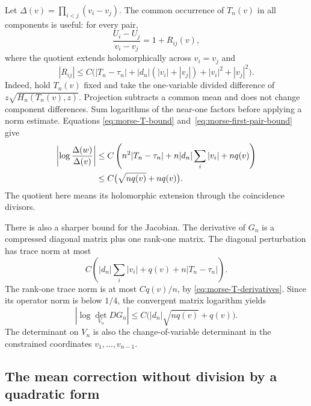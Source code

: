 \documentclass[11pt]{article}
\numberwithin{equation}{section}
\theoremstyle{definition}
\begin{document}
Let $\Delta(v)=\prod_{i<j}(v_i-v_j)$.  The common occurrence of $T_n(v)$
in all components is useful: for every pair,
\begin{equation}
 \frac{U_i-U_j}{v_i-v_j}=1+R_{ij}(v),
 \label{eq:morse-first-divided}
\end{equation}
where the quotient extends holomorphically across $v_i=v_j$ and
\begin{equation}
 |R_{ij}|
 \le C\bigl(|T_n-\tau_n|+|d_n|(|v_i|+|v_j|)
                    +|v_i|^2+|v_j|^2\bigr).
 \label{eq:morse-first-pair-bound}
\end{equation}
Indeed, hold $T_n(v)$ fixed and take the one-variable divided difference
of $z\sqrt{H_n(T_n(v),z)}$.  Projection subtracts a common mean and does
not change component differences.  Sum logarithms of the near-one
factors before applying a norm estimate.  Equations
\eqref{eq:morse-T-bound} and~\eqref{eq:morse-first-pair-bound} give
\begin{align}
 \left|\log\frac{\Delta(w)}{\Delta(v)}\right|
 &\le C\left(n^2|T_n-\tau_n|
         +n|d_n|\sum_i|v_i|+nq(v)\right)\notag\\
 &\le C\bigl(\sqrt{nq(v)}+nq(v)\bigr).
 \label{eq:morse-first-vandermonde}
\end{align}
The quotient here means its holomorphic extension through the coincidence
divisors.

There is also a sharper bound for the Jacobian.  The derivative of
$G_n$ is a compressed diagonal matrix plus one rank-one matrix.  The
diagonal perturbation has trace norm at most
\[
 C\left(|d_n|\sum_i|v_i|+q(v)+n|T_n-\tau_n|\right).
\]
The rank-one trace norm is at most $Cq(v)/n$, by
\eqref{eq:morse-T-derivatives}.  Since its operator norm is below $1/4$,
the convergent matrix logarithm yields
\begin{equation}
 |\log\det_{V_n}DG_n|
 \le C\bigl(|d_n|\sqrt{nq(v)}+q(v)\bigr).
 \label{eq:morse-first-jacobian}
\end{equation}
The determinant on $V_n$ is also the change-of-variable determinant in
the constrained coordinates $v_1,\ldots,v_{n-1}$.

\subsection{The mean correction without division by a quadratic form}
\end{document}
